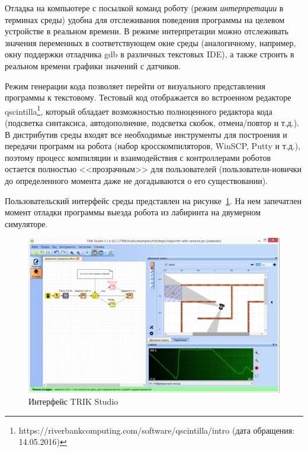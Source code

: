\documentclass[conference]{IEEEtran}
\begin{document}
Отладка на компьютере с посылкой команд роботу (режим \textit{интерпретации} в терминах среды) удобна для отслеживания поведения программы на целевом устройстве в реальном времени. В режиме интерпретации можно отслеживать значения переменных в соответствующем окне среды (аналогичному, например, окну поддержки отладчика gdb в различных текстовых IDE), а также строить в реальном времени графики значений с датчиков.

Режим генерации кода позволяет перейти от визуального представления программы к текстовому. Тестовый код отображается во встроенном редакторе qscintilla\footnote{https://riverbankcomputing.com/software/qscintilla/intro (дата обращения: 14.05.2016)}, который обладает возможностью полноценного редактора кода (подсветка синтаксиса, автодополнение, подсветка скобок, отмена/повтор и т.д.). В дистрибутив среды входят все необходимые инструменты для построения и передачи программ на робота (набор кросскомпиляторов, WinSCP, Putty и т.д.), поэтому процесс компиляции и взаимодействия с контроллерами роботов остается полностью <<прозрачным>> для пользователей (пользователи-новички до определенного момента даже не догадываются о его существовании).

Пользовательский интерфейс среды представлен на рисунке~\ref{image:TS_interface}. На нем запечатлен момент отладки программы выезда робота из лабиринта на двумерном симуляторе.

\begin{figure}[ht]
    \centering
    \includegraphics[width=\textwidth]{TS_CF_Labyrinth.png}
    \caption{Интерфейс TRIK Studio}
    \label{image:TS_interface}
\end{figure}
\end{document}
